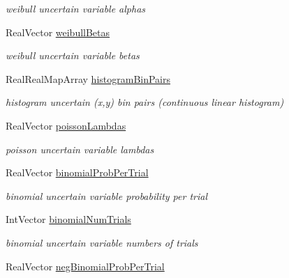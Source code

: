 \begin{DoxyCompactItemize}
\begin{DoxyCompactList}\small\item\em weibull uncertain variable alphas \end{DoxyCompactList}\item 
Real\+Vector \hyperlink{classPecos_1_1AleatoryDistParamsRep_a44216719da7f05eadbf9f2835091cf4d}{weibull\+Betas}\label{classPecos_1_1AleatoryDistParamsRep_a44216719da7f05eadbf9f2835091cf4d}

\begin{DoxyCompactList}\small\item\em weibull uncertain variable betas \end{DoxyCompactList}\item 
Real\+Real\+Map\+Array \hyperlink{classPecos_1_1AleatoryDistParamsRep_a8a6d41a4a8b0ed50983ed44982bbb347}{histogram\+Bin\+Pairs}\label{classPecos_1_1AleatoryDistParamsRep_a8a6d41a4a8b0ed50983ed44982bbb347}

\begin{DoxyCompactList}\small\item\em histogram uncertain (x,y) bin pairs (continuous linear histogram) \end{DoxyCompactList}\item 
Real\+Vector \hyperlink{classPecos_1_1AleatoryDistParamsRep_a734893e3f9fb5a2204aa2178a2517d5b}{poisson\+Lambdas}\label{classPecos_1_1AleatoryDistParamsRep_a734893e3f9fb5a2204aa2178a2517d5b}

\begin{DoxyCompactList}\small\item\em poisson uncertain variable lambdas \end{DoxyCompactList}\item 
Real\+Vector \hyperlink{classPecos_1_1AleatoryDistParamsRep_a049c9c2d888f28fb652f507bf352f195}{binomial\+Prob\+Per\+Trial}\label{classPecos_1_1AleatoryDistParamsRep_a049c9c2d888f28fb652f507bf352f195}

\begin{DoxyCompactList}\small\item\em binomial uncertain variable probability per trial \end{DoxyCompactList}\item 
Int\+Vector \hyperlink{classPecos_1_1AleatoryDistParamsRep_a280f37f4537e88ecce8f65b2ddecac76}{binomial\+Num\+Trials}\label{classPecos_1_1AleatoryDistParamsRep_a280f37f4537e88ecce8f65b2ddecac76}

\begin{DoxyCompactList}\small\item\em binomial uncertain variable numbers of trials \end{DoxyCompactList}\item 
Real\+Vector \hyperlink{classPecos_1_1AleatoryDistParamsRep_ad20547f52ffebe0489c84eeb92686cfc}{neg\+Binomial\+Prob\+Per\+Trial}\label{classPecos_1_1AleatoryDistParamsRep_ad20547f52ffebe0489c84eeb92686cfc}


\end{DoxyCompactItemize}
